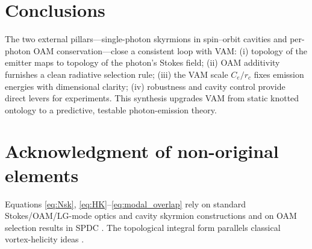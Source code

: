 \documentclass[12pt]{article}
\begin{document}
\section{Conclusions}

The two external pillars---single-photon skyrmions in spin--orbit cavities and per-photon OAM conservation---close a consistent loop with VAM: (i) topology of the emitter maps to topology of the photon’s Stokes field; (ii) OAM additivity furnishes a clean radiative selection rule; (iii) the VAM scale $C_{e}/r_{c}$ fixes emission energies with dimensional clarity; (iv) robustness and cavity control provide direct levers for experiments. This synthesis upgrades VAM from static knotted ontology to a predictive, testable photon-emission theory.

\section*{Acknowledgment of non-original elements}

Equations \eqref{eq:Nsk}, \eqref{eq:HK}--\eqref{eq:modal_overlap} rely on standard Stokes/OAM/LG-mode optics and cavity skyrmion constructions \cite{Ma2025NanoPhotonSkyrmions,Allen1992OAM,Shen2024NatPhoton,BornWolf1999,Jackson1999} and on OAM selection results in SPDC \cite{Kopf2025OAMConservation,Walborn2010SPDCReview}. The topological integral form parallels classical vortex-helicity ideas \cite{Moffatt1969Helicity}.
\end{document}
